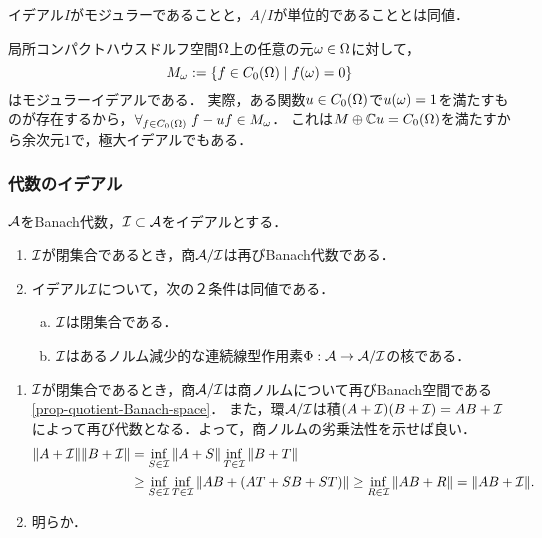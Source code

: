 \documentclass[uplatex,dvipdfmx]{jsreport}
\begin{document}
\begin{lemma}[modular性の特徴付け]
    イデアル$I$がモジュラーであることと，$A/I$が単位的であることとは同値．
\end{lemma}

\begin{example}
    局所コンパクトハウスドルフ空間$\Omega$上の任意の元$\omega\in\Omega$に対して，
    \[M_\omega:=\left\{f\in C_0(\Omega)\mid f(\omega)=0\right\}\]
    はモジュラーイデアルである．
    実際，ある関数$u\in C_0(\Omega)$で$u(\omega)=1$を満たすものが存在するから，$\forall_{f\in C_0(\Omega)}\;f-uf\in M_\omega$．
    これは$M\oplus \mathbb{C} u=C_0(\Omega)$を満たすから余次元$1$で，極大イデアルでもある．
\end{example}

\subsubsection{代数のイデアル}

\begin{lemma}[quotient]\label{lemma-quotient-of-Banach-algebra}
    $\mathcal{A}$をBanach代数，$\mathcal{I}\subset \mathcal{A}$をイデアルとする．
    \begin{enumerate}
        \item $\mathcal{I}$が閉集合であるとき，商$\mathcal{A}/\mathcal{I}$は再びBanach代数である．
        \item イデアル$\mathcal{I}$について，次の２条件は同値である．
        \begin{enumerate}[(a)]
            \item $\mathcal{I}$は閉集合である．
            \item $\mathcal{I}$はあるノルム減少的な連続線型作用素$\Phi:\mathcal{A}\to \mathcal{A}/\mathcal{I}$の核である．
        \end{enumerate}
    \end{enumerate}
\end{lemma}
\begin{Proof}\mbox{}
    \begin{enumerate}
        \item $\mathcal{I}$が閉集合であるとき，商$\mathcal{A}/\mathcal{I}$は商ノルムについて再びBanach空間である\ref{prop-quotient-Banach-space}．
        また，環$\mathcal{A}/\mathcal{I}$は積$(A+\mathcal{I})(B+\mathcal{I})=AB+\mathcal{I}$によって再び代数となる．よって，商ノルムの劣乗法性を示せば良い．
        \begin{align*}
            \|A+\mathcal{I}\|\|B+\mathcal{I}\|&=\inf_{S\in\mathcal{I}}\|A+S\|\inf_{T\in\mathcal{I}}\|B+T\|\\
            &\ge\inf_{S\in\mathcal{I}}\inf_{T\in\mathcal{I}}\|AB+(AT+SB+ST)\|\ge\inf_{R\in\mathcal{I}}\|AB+R\|=\|AB+\mathcal{I}\|.
        \end{align*}
        \item 明らか．
    \end{enumerate}
\end{Proof}
\end{document}
